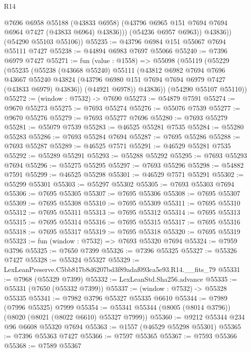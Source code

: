 \begin{lexlean}{R14}
\begin{coremodule}
                @7696
                @6958
                @55188
                (@43833 @6958)
                (@43796 @6965 @151 @7694 @7694 @6964 @7427 (@43833 @6964) @43836)))
            (@54236 @6957 @6963))
          @43836))
      (@54290 @55103 @55106))
@55235 := @43796 @6984 @151 @55067 @7694 @55111 @7427
@55238 := @44894 @6983 @7697 @55066
@55240 := @7396 @6979 @7427
@55271 := fun (value : @1558) =>
  @55098
    (@55119
      (@55229
        (@55235
          (@55238
            (@43668 @55240)
            @55111
            (@43812
              @6982
              @7694
              @7696
              @43667
              @55240
              @43824
              (@43796 @6980 @151 @7694 @7694 @6979 @7427 (@43833 @6979) @43836))
            (@44921 @6978))
          @43836))
      (@54290 @55107 @55110))
@55272 := (window : @7532) -> @7690
@55273 := @54879 @7591
@55274 := @9670 @55273
@55275 := @7693 @55274
@55276 := @55076 @7539
@55277 := @9670 @55276
@55279 := @7693 @55277 @7696
@55280 := @7693 @55279
@55281 := @55079 @7539
@55283 := @46525 @55281 @7535
@55284 := @55280 @55283
@55286 := @7693 @55284 @7694
@55287 := @7695 @55286
@55288 := @7693 @55287
@55289 := @46525 @7571
@55291 := @46529 @55281 @7535
@55292 := @55289 @55291
@55293 := @55288 @55292
@55295 := @7693 @55293 @7694
@55296 := @55275 @55295
@55297 := @7693 @55296
@55298 := @54882 @7591
@55299 := @46525 @55298
@55301 := @46529 @7571 @55291
@55302 := @55299 @55301
@55303 := @55297 @55302
@55305 := @7693 @55303 @7694
@55306 := @7695 @55305
@55307 := @7695 @55306
@55308 := @7695 @55307
@55309 := @7695 @55308
@55310 := @7695 @55309
@55311 := @7695 @55310
@55312 := @7695 @55311
@55313 := @7695 @55312
@55314 := @7695 @55313
@55315 := @7695 @55314
@55316 := @7695 @55315
@55317 := @7695 @55316
@55318 := @7695 @55317
@55319 := @7695 @55318
@55320 := @7695 @55319
@55323 := fun (window : @7532) => @7693 @55320 @7694
@55324 := @7959 @3796
@55325 := @7650 @7399
@55326 := @7396 @55325
@55327 := @55326 @7427
@55328 := @55324 @55327
@55329 := LexLeanPreserve.C5bb817b8d6207bd3f89adaf093ca5e93.R14.__fits_79
@55331 := @7968 (@55329 @7399)
@55332 := LexLeanStd.Sha256.advance
@55335 := @55331 (@7650 (@55332 @7399))
@55337 := (window : @7532) -> @55328 @55335
@55341 := @7982 @3796 @55327 @55335 @6610
@55344 := @7989 (@7996 @55325) @7999
@55354 := @55341 @55344 (@8005 (@8014 @3796)) (@8020 (@8021 (@8022 @6610) @55327 @7999))
@55360 := @9212 @55344 @234 @96 @6608 @55320 @7694
@55363 := @1557 (@46529 @55298 @55301)
@55365 := @7396 @55363 @7427
@55366 := @7597 @55365
@55367 := @7593 @55366
@55368 := @7589 @55367

\end{coremodule}
\end{lexlean}
